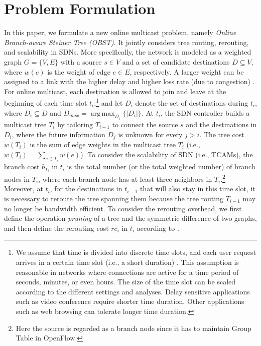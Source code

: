 \documentclass[10pt, conference, letterpaper]{IEEEtran}
\theoremstyle{definition}
\newtheorem{defi}{Definition}
\DeclareMathOperator*{\argmax}{arg\,max}
\begin{document}
\section{Problem Formulation} \label{sec: problem formulation}
In this paper, we formulate a new online multicast problem, namely \emph{Online Branch-aware Steiner Tree (OBST)}. It jointly considers tree routing, rerouting, and scalability in SDNs. More specifically, the network is modeled as a weighted graph $G=\{V,E\}$ with a source $s\in V$ and a set of candidate destinations $D\subseteq V$, where {\color{black}$w(e)$ is the weight of edge $e\in E$, respectively.}
{\color{black}
A larger weight can be assigned to %
a link with the higher delay and higher loss rate (due  to congestion) \cite{LinkWeightSetting
}.}
For online multicast, each destination is allowed to join and leave at the beginning of each time slot $t_i$,\footnote{
We assume that time is divided into discrete time slots, and each user request arrives in a certain time slot (i.e., a short duration) \cite{timeSlotAssumption,timeSlotAssumption2}. This assumption is reasonable in networks where connections are active for a time period of seconds, minutes, or even hours. The size of the time slot can be scaled according to the different settings and analyses. Delay sensitive applications such as video conference require shorter time duration. Other applications such as web browsing can tolerate longer time duration.} and let $D_i$ denote the set of destinations during $t_i$, where $D_i\subseteq D$ and $D_{max}=\argmax_{D_i}\{|D_i|\}$. At $t_i$, the SDN controller builds a multicast tree $T_i$ by tailoring $T_{i-1}$ to connect the source $s$ and the destinations in $D_i$, where the future information $D_j$ is unknown for every $j>i$. The tree cost $w(T_i)$ is the sum of edge weights in the multicast tree $T_i$ (i.e., $w(T_i)=\sum_{e\in T_i} w(e)$). To consider the scalability of SDN (i.e., TCAMs), {\color{black}
the branch cost $b_{T_i}$ in $t_i$ is %
the total number (or the total weighted number) of branch nodes in $T_i$,}
where each branch node has at least three neighbors in $T_i$.\footnote{Here the source is regarded as a branch node since it has to maintain Group Table in OpenFlow.} Moreover, at $t_i$, for the destinations in $t_{i-1}$ that will also stay in this time slot, it is necessary to reroute the tree spanning them because the tree routing $T_{i-1}$ may no longer be bandwidth efficient. To consider the rerouting overhead, we first define the operation \emph{pruning} of a tree and the symmetric difference of two graphs, and then define the rerouting cost $rc_i$ in $t_i$ according to \cite{ConsistentMigration-SDN} .
\end{document}
